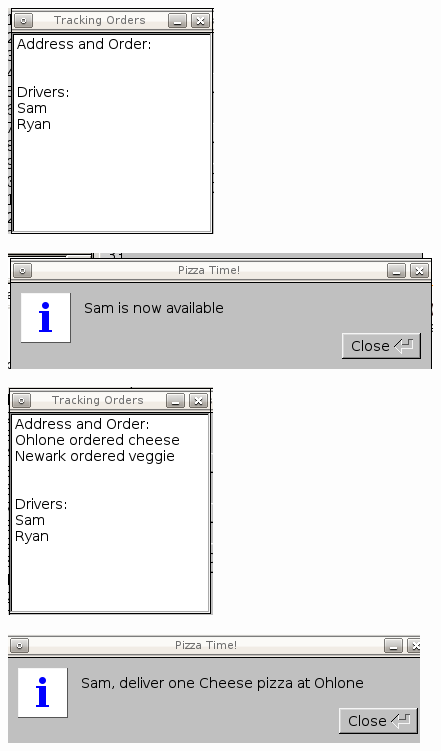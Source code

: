 \includegraphics{../drivers.png}


\includegraphics{../sam.png}


\includegraphics{../both.png}


\includegraphics{../driverdeliver.png}


 